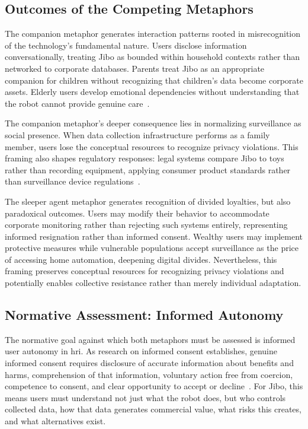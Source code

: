 \documentclass[11pt,showkeys]{../../shared/essay}
\begin{document}
\subsection{Outcomes of the Competing Metaphors}

The companion metaphor generates interaction patterns rooted in misrecognition of the technology's fundamental nature. Users disclose information conversationally, treating Jibo as bounded within household contexts rather than networked to corporate databases. Parents treat Jibo as an appropriate companion for children without recognizing that children's data become corporate assets. Elderly users develop emotional dependencies without understanding that the robot cannot provide genuine care~\cite{darling_whos_2015}.

The companion metaphor's deeper consequence lies in normalizing surveillance as social presence. When data collection infrastructure performs as a family member, users lose the conceptual resources to recognize privacy violations. This framing also shapes regulatory responses: legal systems compare Jibo to toys rather than recording equipment, applying consumer product standards rather than surveillance device regulations~\cite{jones_hacking_2017}.

The sleeper agent metaphor generates recognition of divided loyalties, but also paradoxical outcomes. Users may modify their behavior to accommodate corporate monitoring rather than rejecting such systems entirely, representing informed resignation rather than informed consent. Wealthy users may implement protective measures while vulnerable populations accept surveillance as the price of accessing home automation, deepening digital divides. Nevertheless, this framing preserves conceptual resources for recognizing privacy violations and potentially enables collective resistance rather than merely individual adaptation.

\subsection{Normative Assessment: Informed Autonomy}

The normative goal against which both metaphors must be assessed is informed user autonomy in \gls{hri}. As research on informed consent establishes, genuine informed consent requires disclosure of accurate information about benefits and harms, comprehension of that information, voluntary action free from coercion, competence to consent, and clear opportunity to accept or decline~\cite{millett_cookies_2001}. For Jibo, this means users must understand not just what the robot does, but who controls collected data, how that data generates commercial value, what risks this creates, and what alternatives exist.
\end{document}
